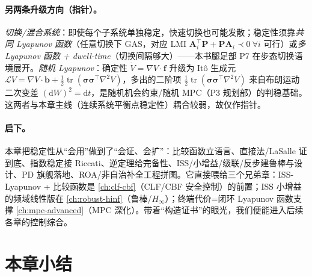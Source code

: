 \paragraph{另两条升级方向（指针）。}
\emph{切换/混合系统}：即使每个子系统单独稳定，快速切换也可能发散；稳定性须靠\emph{共同 Lyapunov 函数}（任意切换下 GAS，对应 LMI $\mathbf{A}_i^\top\mathbf{P}+\mathbf{P}\mathbf{A}_i\prec0\ \forall i$ 可行）或\emph{多 Lyapunov 函数 + dwell-time}（切换间隔够大）——本书腿足部 P7 在步态切换语境展开。\emph{随机 Lyapunov}：确定性 $\dot V=\nabla V\cdot\mathbf{f}$ 升级为 Itô 生成元 $\mathcal{L}V=\nabla V\cdot\mathbf{b}+\tfrac12\operatorname{tr}(\boldsymbol{\sigma}\boldsymbol{\sigma}^\top\nabla^2 V)$，多出的二阶项 $\tfrac12\operatorname{tr}(\boldsymbol{\sigma}\boldsymbol{\sigma}^\top\nabla^2 V)$ 来自布朗运动二次变差 $(\mathrm dW)^2=\mathrm dt$，是随机机会约束/随机 MPC（P3 规划部）的判稳基础。这两者与本章主线（连续系统平衡点稳定性）耦合较弱，故仅作指针。

\paragraph{启下。}
本章把稳定性从“会用”做到了“会证、会扩”：比较函数立语言、直接法/LaSalle 证到底、指数稳定接 Riccati、逆定理给完备性、ISS/小增益/级联/反步建鲁棒与设计、PD 旗舰落地、ROA/非自治补全工程拼图。它直接喂给三个兄弟章：ISS-Lyapunov + 比较函数是 \cref{ch:clf-cbf}（CLF/CBF 安全控制）的前置；ISS 小增益的频域线性版在 \cref{ch:robust-hinf}（鲁棒/$H_\infty$）；终端代价=闭环 Lyapunov 函数支撑 \cref{ch:mpc-advanced}（MPC 深化）。带着“构造证书”的眼光，我们便能进入后续各章的控制综合。

\section*{本章小结}

